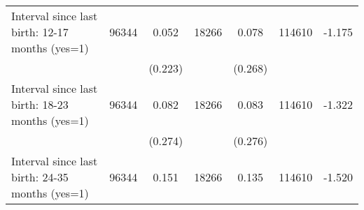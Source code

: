 \begin{tabular}{@{\extracolsep{5pt}}lcccccc}
Interval since last birth: 12-17 months (yes=1)   & 96344    & 0.052    & 18266    & 0.078    & 114610    & -1.175   \\                                                                                                                                                                                                                                                                                                                                                                                                                                                                                                       
 &   & (0.223)  &   & (0.268)  &   &  \\ [1ex]                                                                                                                                                                                                                                                                                                                                                                                                                                                                                                                                                                                
Interval since last birth: 18-23 months (yes=1)   & 96344    & 0.082    & 18266    & 0.083    & 114610    & -1.322   \\                                                                                                                                                                                                                                                                                                                                                                                                                                                                                                       
 &   & (0.274)  &   & (0.276)  &   &  \\ [1ex]                                                                                                                                                                                                                                                                                                                                                                                                                                                                                                                                                                                
Interval since last birth: 24-35 months (yes=1)   & 96344    & 0.151    & 18266    & 0.135    & 114610    & -1.520   \\                                                                                                                                                                                                                                                                                                                                                                                                                                                                                                       

\end{tabular}
